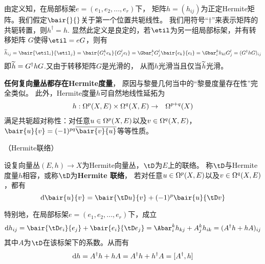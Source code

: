 
由定义知，在局部标架$e=(e_1,e_2,...,e_r)$下，
矩阵$h=(h_{ij})$为正定Hermite矩阵。我们假定$\bair{}{}$关于第一个位置共轭线性。
我们用符号“$\dag$”来表示矩阵的共轭转置，则$h^\dag=h$.
显然此定义是良定的，若$\etil$为另一组局部标架，并有转移矩阵
$G$使得$\etil=eG$，则有
$$
  \htil_{ij}=\bair{\etil_i}{\etil_j}
= \bair{G_i^ke_k}{G_j^le_l}
= \Gbar_i^kG_j^l\bair{e_k}{e_l}
= \Gbar_i^kh_{kl}G^l_j
= (G^\dag hG)_{ij}
$$
即$\widetilde{h}=G^\dag hG$.又由于转移矩阵$G$是光滑的，
从而$h$光滑当且仅当$\widetilde{h}$光滑。

\textbf{任何复向量丛都存在Hermite度量}，
原因与黎曼几何当中的“黎曼度量存在性”完全类似。
此外，Hermite度量$h$可自然地线性延拓为
\begin{eqnarray*}
  h:\Omega^p(X,E)\times\Omega^q(X,E)
  &\to&\Omega^{p+q}(X)
\end{eqnarray*}
满足共轭超对称性：对任意$u\in\Omega^p(X,E)$以及$v\in\Omega^q(X,E)$，
$\bair{u}{v}=(-1)^{pq}\overline{\bair{v}{u}}$等等性质。

\begin{definition}（Hermite联络）

设复向量丛$(E,h)\to X$为Hermite向量丛，$\tD$为$E$上的联络。
称$\tD$与Hermite度量$h$相容，或称$\tD$为\textbf{Hermite 联络}，
若对任意$u\in\Omega^p(X,E)$以及$v\in\Omega^q(X,E)$，都有
$$
  \td\bair{u}{v}
=
  \bair{\tD u}{v}+(-1)^p\bair{u}{\tD v}
$$
\end{definition}
特别地，在局部标架$e=(e_1,e_2,...,e_r)$下，成立
$$
  \td h_{ij}=\bair{\tD e_i}{e_j}+\bair{e_i}{\tD e_j}
            =\Abar^k_ih_{kj}+A^k_jh_{ik}
            =(A^\dag h+hA)_{ij}
$$
其中$A$为$\tD$在该标架下的系数。从而有
$$\mathrm{d} h=A^\dag h+hA=A^\dag h+h^\dag A=[A^\dag,h]$$


